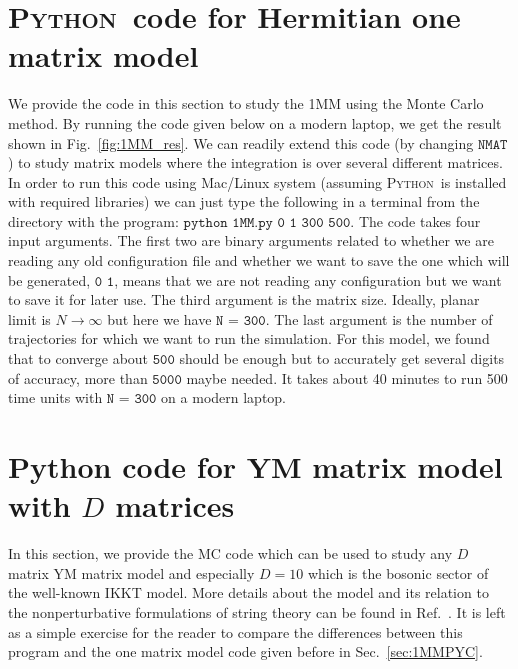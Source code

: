 \documentclass[letter,11pt]{article}
\newcommand{\PY}{\textsc{Python}}
\begin{document}
\section{\label{sec:1MMPYC}\PY~code for Hermitian one matrix model}
We provide the code in this section to study the 1MM using the Monte Carlo method. By running the code given below
on a modern laptop, we get the result shown in 
Fig.~\ref{fig:1MM_res}. We can readily extend this code (by changing $\texttt{NMAT}$) to study matrix models where the integration is over several different matrices. 
In order to run this code using Mac/Linux system (assuming  \PY~is installed with required libraries) we can just type the following in a terminal from the directory with the program:
$\texttt{python 1MM.py 0 1 300 500}$. The code takes four input arguments. The first two are binary arguments
related to whether we are reading any old configuration file and whether we want to save the one which will be 
generated, $\texttt{0 1}$, means that we are not reading any configuration but we want to save it for later use. The third argument is the matrix size. Ideally, planar limit is $ N \to \infty$ but here we have $\texttt{N = 300}$. The last argument is the 
number of trajectories for which we want to run the simulation. For this model, we found that to converge about $\texttt{500}$ should be enough but to accurately get several digits of accuracy, more than $\texttt{5000}$ maybe needed. It takes about 40 minutes to run 500 time units with $\texttt{N = 300}$ on a modern laptop. 
\begin{mdframed}[backgroundcolor=mauve!3] 

\end{mdframed} 
\section{\label{sec:YMC}Python code for YM matrix model with $D$ matrices} 
In this section, we provide the MC code which can be used to study any $D$ matrix YM matrix model and especially $D=10$ which is the bosonic sector of the well-known IKKT model. More details about the model and its relation to the nonperturbative formulations of string theory can be found in Ref.~\cite{Hotta:1998en}. It is left as a simple exercise for the reader to compare the differences between this program and the one matrix model code given before in Sec.~\ref{sec:1MMPYC}. 
	\begin{mdframed}[backgroundcolor=mauve!3] 
			
	\end{mdframed} 
\end{document}
